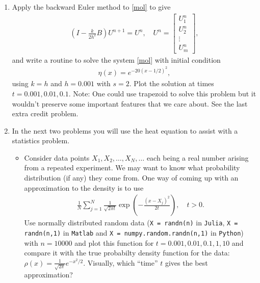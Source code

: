 \documentclass[10pt]{amsart}
\begin{document}
\begin{enumerate}[label={\bf Problem~{\arabic*}:}]
\mline

%
%  

\item Apply the backward Euler method to \eqref{mol} to give
  \begin{align}\label{be}
    \left( I - \frac{k}{2h^2}B \right) U^{n+1} =  U^n, \quad U^n = \begin{bmatrix} U_1^n \\ U_2^n \\ \vdots \\U_m^n \end{bmatrix},
  \end{align}
  and write a routine to solve the system \eqref{mol} with initial condition
  \begin{align*}
    \eta(x) = e^{-20(x-1/2)^2},
  \end{align*}
  using $k = h$ and $h = 0.001$ with $s = 2$.  Plot the solution at times $t = 0.001,0.01,0.1$.  Note:  One could use trapezoid to solve this problem but it wouldn't preserve some important features that we care about.  See the last extra credit problem.

  \mline
  
  \item In the next two problems you will use the heat equation to assist with a statistics problem.
  \begin{itemize}  
\item Consider data points $X_1,X_2,\ldots,X_N,\ldots$ each being a real number arising from a repeated experiment.  We may want to know what probability distribution (if any) they come from.  One way of coming up with an approximation to the density is to use
  \begin{align}\label{eq:heat-evolve}
    \frac{1}{N} \sum_{j=1}^N \frac{1}{\sqrt{2 \pi t}} \exp \left( - \frac{(x - X_j)^2}{2t} \right), \quad t > 0.
  \end{align}
  Use normally distributed random data ({\tt X = randn(n)} in {\tt Julia},  {\tt X = randn(n,1)} in {\tt Matlab} and {\tt X = numpy.random.randn(n,1)} in {\tt Python}) with $n = 10000$ and plot this function for $t = 0.001,0.01,0.1,1,10$ and compare it with the true  probabilty density function for the data:  $\rho(x) = \frac{1}{\sqrt{2 \pi}} e^{-x^2/2}$. Visually, which ``time'' $t$ gives the best approximation?\\


\end{itemize}
\end{enumerate}
\end{document}

